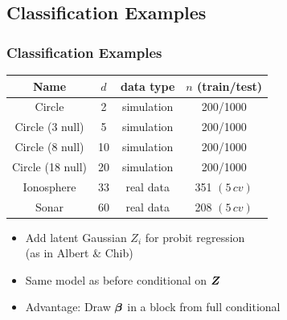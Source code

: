 \documentclass[dvips]{beamer}
\newcommand{\bs}[2]{\begin{frame} \frametitle{#1} 
{#2}
\end{frame} }
\begin{document}
\subsection{Classification Examples}
\bs{Classification Examples} {
\begin{table}[h]
  \centering
  \begin{tabular}{cccc}
    Name          & $d$ & data type  & $n$ (train/test) \\ \hline
    Circle        &   2 & simulation & 200/1000 \\
    Circle (3 null)      &   5 & simulation & 200/1000 \\
    Circle (8 null)     &  10 & simulation & 200/1000 \\
    Circle (18 null)     &  20 & simulation & 200/1000 \\
    Ionosphere    &  33 & real data  & 351 $(5\,cv)$  \\
    Sonar         &  60 & real data  & 208 $(5\,cv)$  \\ \hline
  \end{tabular}
\end{table}

  \begin{itemize}
  \item Add latent Gaussian $Z_i$ for probit regression \\(as in Albert
  \& Chib)
\item Same model as before conditional on $\bm Z$
\item Advantage:  Draw $\bm \beta$ in a block from full conditional
  \end{itemize}

}
\end{document}
